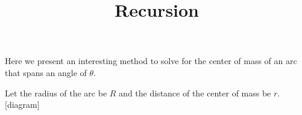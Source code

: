 \documentclass{article}
\title{Recursion}
\date{}
\begin{document}
\maketitle

Here we present an interesting method to solve for the center of mass of an arc that spans an angle of $\theta$.

Let the radius of the arc be $R$ and the distance of the center of mass be $r$. [diagram] 
\end{document}
